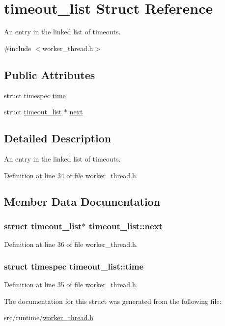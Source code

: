 \hypertarget{structtimeout__list}{\section{timeout\-\_\-list Struct Reference}
\label{structtimeout__list}
}


An entry in the linked list of timeouts.  




{\ttfamily \#include $<$worker\-\_\-thread.\-h$>$}

\subsection*{Public Attributes}
\begin{DoxyCompactItemize}
\item 
struct timespec \hyperlink{structtimeout__list_af09ead12f05ea610fcf1442b61836b57}{time}
\item 
struct \hyperlink{structtimeout__list}{timeout\-\_\-list} $\ast$ \hyperlink{structtimeout__list_a6bfc03f73122960eb58e97453eeb26c8}{next}
\end{DoxyCompactItemize}


\subsection{Detailed Description}
An entry in the linked list of timeouts. 

Definition at line 34 of file worker\-\_\-thread.\-h.



\subsection{Member Data Documentation}
\hypertarget{structtimeout__list_a6bfc03f73122960eb58e97453eeb26c8}{
\subsubsection[{next}]{\setlength{\rightskip}{0pt plus 5cm}struct {\bf timeout\-\_\-list}$\ast$ timeout\-\_\-list\-::next}}\label{structtimeout__list_a6bfc03f73122960eb58e97453eeb26c8}


Definition at line 36 of file worker\-\_\-thread.\-h.

\hypertarget{structtimeout__list_af09ead12f05ea610fcf1442b61836b57}{
\subsubsection[{time}]{\setlength{\rightskip}{0pt plus 5cm}struct timespec timeout\-\_\-list\-::time}}\label{structtimeout__list_af09ead12f05ea610fcf1442b61836b57}


Definition at line 35 of file worker\-\_\-thread.\-h.



The documentation for this struct was generated from the following file\-:\begin{DoxyCompactItemize}
\item 
src/runtime/\hyperlink{worker__thread_8h}{worker\-\_\-thread.\-h}\end{DoxyCompactItemize}
